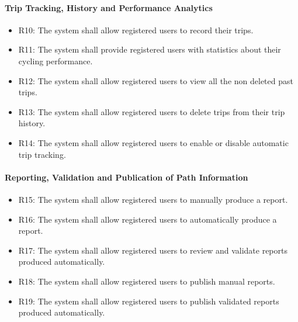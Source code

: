 \paragraph{Trip Tracking, History and Performance Analytics}
\begin{itemize}
    \item R10: The system shall allow registered users to record their trips.
    \item R11: The system shall provide registered users with statistics about their cycling performance.
    \item R12: The system shall allow registered users to view all the non deleted past trips.
    \item R13: The system shall allow registered users to delete trips from their trip history.
    \item R14: The system shall allow registered users to enable or disable automatic trip tracking. 
\end{itemize}

\paragraph{Reporting, Validation and Publication of Path Information}
\begin{itemize}
    \item R15: The system shall allow registered users to manually produce a report.
    \item R16: The system shall allow registered users to automatically produce a report.
    \item R17: The system shall allow registered users to review and validate reports produced automatically. 
    \item R18: The system shall allow registered users to publish manual reports.
    \item R19: The system shall allow registered users to publish validated reports produced automatically.
\end{itemize}

